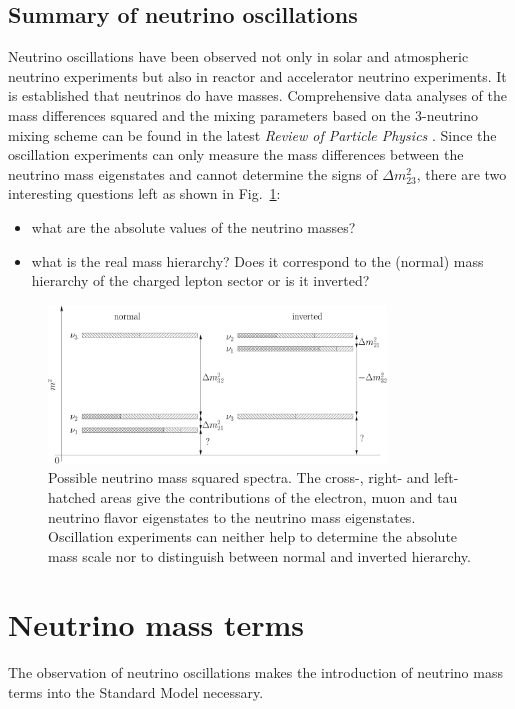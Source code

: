 \subsection{Summary of neutrino oscillations}
\label{sec:allo}
Neutrino oscillations have been observed not only in solar and
atmospheric neutrino experiments but also in reactor and accelerator
neutrino experiments. It is established that neutrinos do have
masses. Comprehensive data analyses of the mass differences squared
and the mixing parameters based on the 3-neutrino mixing scheme can be
found in the latest \emph{Review of Particle Physics} \cite{PDG08}.
Since the oscillation experiments can only measure the mass
differences between the neutrino mass eigenstates and cannot determine
the signs of $\Delta m^{2}_{23}$, there are two interesting questions
left as shown in Fig.~\ref{fig:hie}:
\begin{itemize}
\item what are the absolute values of the neutrino masses?
\item what is the real mass hierarchy? Does it correspond to the
(normal) mass hierarchy of the charged lepton sector or is it
inverted?
\end{itemize}
\begin{figure}[tbhp]
\centering
\includegraphics[width=0.8\textwidth]{massHierarchy}  
\caption{Possible neutrino mass squared spectra. The cross-, right-
and left-hatched areas give the contributions of the electron, muon
and tau neutrino flavor eigenstates to the neutrino mass
eigenstates. Oscillation experiments can neither help to determine the
absolute mass scale nor to distinguish between normal and inverted
hierarchy.}
\label{fig:hie}
\end{figure}


\section{Neutrino mass terms}
\label{sec:nema}
The observation of neutrino oscillations makes the introduction of
neutrino mass terms into the Standard Model necessary.

